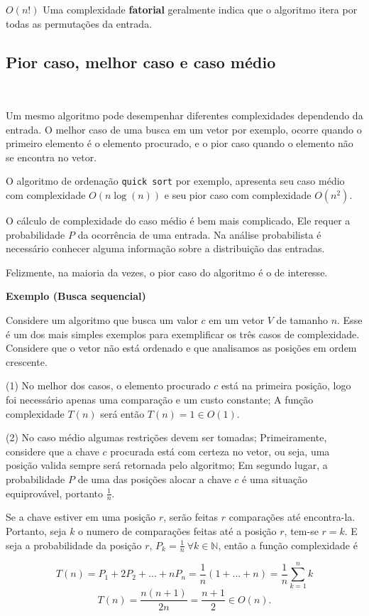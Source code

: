 $O(n!)$ Uma complexidade \textbf{fatorial} geralmente indica que o algoritmo itera por todas as permutações da entrada.

\subsection{Pior caso, melhor caso e caso médio}
\

Um mesmo algoritmo pode desempenhar diferentes complexidades dependendo da entrada. O melhor caso de uma busca em um vetor por exemplo, ocorre quando o primeiro elemento é o elemento procurado, e o pior caso quando o elemento não se encontra no vetor.

O algoritmo de ordenação \texttt{quick sort} por exemplo, apresenta seu caso médio com complexidade $O(n\log(n))$ e seu pior caso com complexidade $O(n^2)$.

O cálculo de complexidade do caso médio é bem mais complicado, Ele requer a probabilidade $P$ da ocorrência de uma entrada. Na análise probabilista é necessário conhecer alguma informação sobre a distribuição das entradas.

Felizmente, na maioria da vezes, o pior caso do algoritmo é o de interesse.

\textbf{Exemplo (Busca sequencial)}

Considere um algoritmo que busca um valor $c$ em um vetor $V$ de tamanho $n$. Esse é um dos mais simples exemplos para exemplificar os três casos de complexidade. Considere que o vetor não está ordenado e que analisamos as posições em ordem crescente.

(1) No melhor dos casos, o elemento procurado $c$ está na primeira posição, logo foi necessário apenas uma comparação e um custo constante; A função complexidade $T(n)$ será então $T(n) = 1 \in O(1)$.

(2) No caso médio algumas restrições devem ser tomadas; Primeiramente, considere que a chave $c$ procurada está com certeza no vetor, ou seja, uma posição valida sempre será retornada pelo algoritmo; Em segundo lugar, a probabilidade $P$ de uma das posições alocar a chave $c$ é uma situação equiprovável, portanto $\frac{1}{n}$.

Se a chave estiver em uma posição $r$, serão feitas $r$ comparações até encontra-la. Portanto, seja $k$ o numero de comparações feitas até a posição $r$, tem-se $r=k$. E seja a probabilidade da posição $r$, $P_k = \frac{1}{n} \ \forall k \in \mathbb{N}$, então a função complexidade é 

\[T(n) = P_1 + 2P_2 + ... + nP_n = \frac{1}{n}(1+...+n) = \frac{1}{n}\sum_{k=1}^n k\]
\[T(n)=\frac{n(n+1)}{2n} = \frac{n+1}{2} \in O(n).\]

